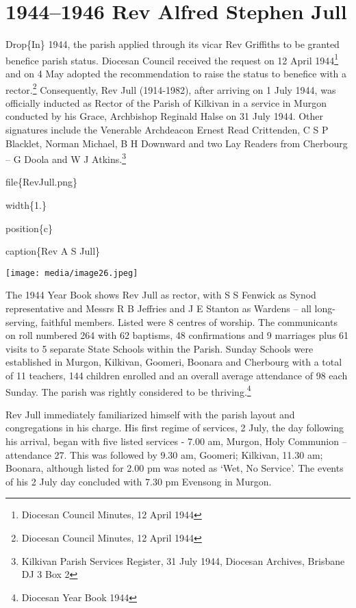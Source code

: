 \hypertarget{rev-alfred-stephen-jull}{%
\chapter{1944--1946 Rev Alfred Stephen Jull}\label{rev-alfred-stephen-jull}}

Drop\{In\} 1944, the parish applied through its vicar Rev Griffiths to be granted benefice parish status. Diocesan Council received the request on 12 April 1944\footnote{Diocesan Council Minutes, 12 April 1944} and on 4 May adopted the recommendation to raise the status to benefice with a rector.\footnote{Diocesan Council Minutes, 12 April 1944} Consequently, Rev Jull (1914-1982), after arriving on 1 July 1944, was officially inducted as Rector of the Parish of Kilkivan in a service in Murgon conducted by his Grace, Archbishop Reginald Halse on 31 July 1944. Other signatures include the Venerable Archdeacon Ernest Read Crittenden, C S P Blacklet, Norman Michael, B H Downward and two Lay Readers from Cherbourg -- G Doola and W J Atkins.\footnote{Kilkivan Parish Services Register, 31 July 1944, Diocesan Archives, Brisbane DJ 3 Box 2}

file\{RevJull.png\}

width\{1.\}

position\{c\}

caption\{Rev A S Jull\}

\texttt{[image: media/image26.jpeg]}

The 1944 Year Book shows Rev Jull as rector, with S S Fenwick as Synod representative and Messrs R B Jeffries and J E Stanton as Wardens -- all long-serving, faithful members. Listed were 8 centres of worship. The communicants on roll numbered 264 with 62 baptisms, 48 confirmations and 9 marriages plus 61 visits to 5 separate State Schools within the Parish. Sunday Schools were established in Murgon, Kilkivan, Goomeri, Boonara and Cherbourg with a total of 11 teachers, 144 children enrolled and an overall average attendance of 98 each Sunday. The parish was rightly considered to be thriving.\footnote{Diocesan Year Book 1944}

Rev Jull immediately familiarized himself with the parish layout and congregations in his charge. His first regime of services, 2 July, the day following his arrival, began with five listed services - 7.00 am, Murgon, Holy Communion -- attendance 27. This was followed by 9.30 am, Goomeri; Kilkivan, 11.30 am; Boonara, although listed for 2.00 pm was noted as `Wet, No Service'. The events of his 2 July day concluded with 7.30 pm Evensong in Murgon.

